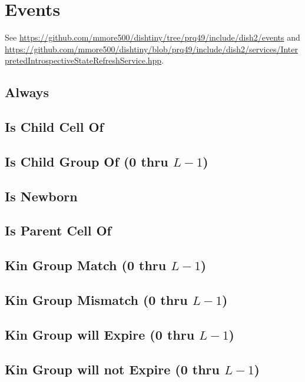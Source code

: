 \section{Events}

See \url{https://github.com/mmore500/dishtiny/tree/prq49/include/dish2/events} and \url{https://github.com/mmore500/dishtiny/blob/prq49/include/dish2/services/InterpretedIntrospectiveStateRefreshService.hpp}.

\subsection{Always}

\subsection{Is Child Cell Of}

\subsection{Is Child Group Of (0 thru $L-1$)}

\subsection{Is Newborn}

\subsection{Is Parent Cell Of}

\subsection{Kin Group Match (0 thru $L-1$)}

\subsection{Kin Group Mismatch (0 thru $L-1$)}

\subsection{Kin Group will Expire (0 thru $L-1$)}

\subsection{Kin Group will not Expire (0 thru $L-1$)}

